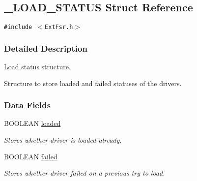 \hypertarget{struct__LOAD__STATUS}{
\subsection{\_\-LOAD\_\-STATUS Struct Reference}
\label{struct__LOAD__STATUS}
}
{\tt \#include $<$Ext\-Fsr.h$>$}



\subsubsection{Detailed Description}
Load status structure.

Structure to store loaded and failed statuses of the drivers. 

\subsubsection*{Data Fields}
\begin{CompactItemize}
\item 
\hypertarget{struct__LOAD__STATUS_m0}{
BOOLEAN \hyperlink{struct__LOAD__STATUS_m0}{loaded}}
\label{struct__LOAD__STATUS_m0}

\begin{CompactList}\small\item\em Stores whether driver is loaded already.\item\end{CompactList}\item 
\hypertarget{struct__LOAD__STATUS_m1}{
BOOLEAN \hyperlink{struct__LOAD__STATUS_m1}{failed}}
\label{struct__LOAD__STATUS_m1}

\begin{CompactList}\small\item\em Stores whether driver failed on a previous try to load.\item\end{CompactList}\end{CompactItemize}
